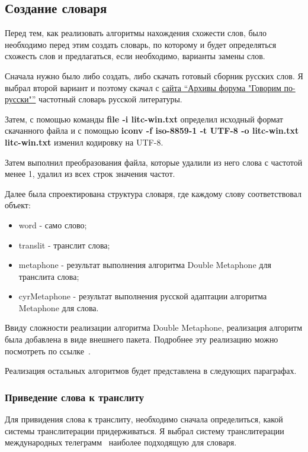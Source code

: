 \subsection{Создание словаря}

Перед тем, как реализовать алгоритмы нахождения схожести слов, было необходимо перед этим создать словарь, по которому и будет определяться схожесть слов и предлагаться, если необходимо, варианты замены слов.

Сначала нужно было либо создать, либо скачать готовый сборник русских слов. Я выбрал второй вариант и поэтому скачал с \href{http://speakrus.ru/dict/index.htm}{сайта ``Архивы форума "Говорим по-русски"''} частотный словарь русской литературы.

Затем, с помощью команды \textbf{file -i litc-win.txt} определил исходный формат скачанного файла и с помощью \textbf{iconv -f iso-8859-1 -t UTF-8 -o litc-win.txt litc-win.txt} изменил кодировку на UTF-8.

Затем выполнил преобразования файла, которые удалили из него слова с частотой менее 1, удалил из всех строк значения частот. 

Далее была спроектирована структура словаря, где каждому слову соответствовал объект:

\begin{itemize}
  \item word - само слово;
  \item translit - транслит слова;
  \item metaphone - результат выполнения алгоритма Double Metaphone для транслита слова;
  \item cyrMetaphone - результат выполнения русской адаптации алгоритма Metaphone для слова.
\end{itemize}

Ввиду сложности реализации алгоритма Double Metaphone, реализация алгоритм была добавлена в виде внешнего пакета. Подробнее эту реализацию можно посмотреть по ссылке~\cite{doubleMetaphoneNPM}.

Реализация остальных алгоритмов будет представлена в следующих параграфах.

\subsubsection{Приведение слова к транслиту}

Для привидения слова к транслиту, необходимо сначала определиться, какой системы транслитерации придерживаться. Я выбрал систему транслитерации международных телеграмм~\cite{instukcia} наиболее подходящую для словаря.

